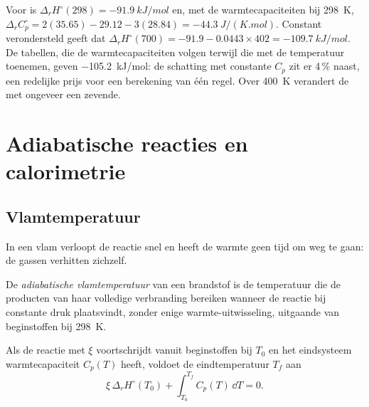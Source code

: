 \begin{example}\label{ex:b2:reaction-enthalpy:kirchhoff}
Voor  is $\Delta_r H^\circ(298) =
\qty{-91.9}{kJ/mol}$ en, met de warmtecapaciteiten bij \qty{298}{K},
$\Delta_r C_p^\circ = 2(35.65) - 29.12 - 3(28.84) =
\qty{-44.3}{J/(K.mol)}$. Constant verondersteld geeft dat $\Delta_r
H^\circ(700) = -91.9 - 0.0443 \times 402 = \qty{-109.7}{kJ/mol}$. De tabellen,
die de warmtecapaciteiten volgen terwijl die met de temperatuur toenemen, geven
\qty{-105.2}{kJ/mol}: de schatting met constante $C_p$ zit er 4\,\% naast, een
redelijke prijs voor een berekening van één regel. Over \qty{400}{K} verandert de
 met ongeveer een zevende.
\end{example}

\section{Adiabatische reacties en calorimetrie}

\subsection*{Vlamtemperatuur}

In een vlam verloopt de reactie snel en heeft de warmte geen tijd om weg te gaan: de
gassen verhitten zichzelf.

\begin{definition}\label{def:b2:reaction-enthalpy:flame-temperature}
De \emph{adiabatische vlamtemperatuur}
van een brandstof is de temperatuur die de producten van haar volledige
verbranding bereiken wanneer de reactie bij constante druk plaatsvindt, zonder
enige warmte-uitwisseling, uitgaande van beginstoffen bij \qty{298}{K}.
\end{definition}

\begin{proposition}\label{prop:b2:reaction-enthalpy:flame}
Als de reactie met $\xi$ voortschrijdt vanuit beginstoffen bij $T_0$ en het eindsysteem
warmtecapaciteit $C_p(T)$ heeft, voldoet de eindtemperatuur $T_f$ aan
\[
  \xi\,\Delta_r H^\circ(T_0) + \int_{T_0}^{T_f}C_p(T)\,\dd T = 0 .
\]
\end{proposition}

